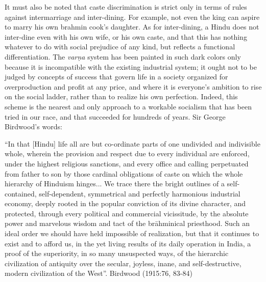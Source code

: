 It must also be noted that caste discrimination is strict only in terms of rules against intermarriage and inter-dining. For example, not even the king can aspire to marry his own brahmin cook’s daughter. As for inter-dining, a Hindu does not inter-dine even with his own wife, or his own caste, and that this has nothing whatever to do with social prejudice of any kind, but reflects a functional differentiation. The {\sl varṇa} system has been painted in such dark colors only because it is incompatible with the existing industrial system; it ought not to be judged by concepts of success that govern life in a society organized for overproduction and profit at any price, and where it is everyone’s ambition to rise on the social ladder, rather than to realize his own perfection. Indeed, this scheme is the nearest and only approach to a workable socialism that has been tried in our race, and that succeeded for hundreds of years. Sir George Birdwood’s words: 

\begin{myquote}
“In that [Hindu] life all are but co-ordinate parts of one undivided and indivisible whole, wherein the provision and respect due to every individual are enforced, under the highest religious sanctions, and every office and calling perpetuated from father to son by those cardinal obligations of caste on which the whole hierarchy of Hinduism hinges... We trace there the bright outlines of a self-contained, self-dependent, symmetrical and perfectly harmonious industrial economy, deeply rooted in the popular conviction of its divine character, and protected, through every political and commercial vicissitude, by the absolute power and marvelous wisdom and tact of the brāhminical priesthood. Such an ideal order we should have held impossible of realization, but that it continues to exist and to afford us, in the yet living results of its daily operation in India, a proof of the superiority, in so many unsuspected ways, of the hierarchic civilization of antiquity over the secular, joyless, inane, and self-destructive, modern civilization of the West”.
\hfill Birdwood (1915:76, 83-84)
\end{myquote}

